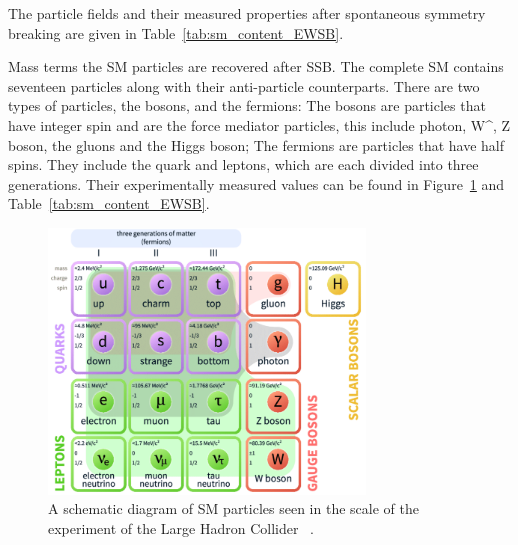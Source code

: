{    

The particle fields and their measured properties after spontaneous symmetry breaking are given in Table~\ref{tab:sm_content_EWSB}.

Mass terms the SM particles are recovered after SSB. The complete SM contains seventeen particles along with their anti-particle counterparts. There are two types of particles, the bosons, and the fermions: The bosons are particles that have integer spin and are the force mediator particles, this include photon, W^{\pm}, Z boson, the gluons and the Higgs boson; The fermions are particles that have half spins.
They include the quark and leptons, which are each divided into three generations. Their experimentally measured values can be found in Figure~\ref{fig:SM} and Table~\ref{tab:sm_content_EWSB}.

    \begin{figure}[!htb]
        \begin{center}
            \includegraphics[width=0.75\textwidth]{figures/chapter_SM/SM}
            \caption{
                A schematic diagram of SM particles seen in the scale of the experiment of the Large Hadron Collider ~\cite{enwiki:1060203113}.
            }
            \label{fig:SM}
        \end{center}
    \end{figure}


%
%
%
%
%

}
